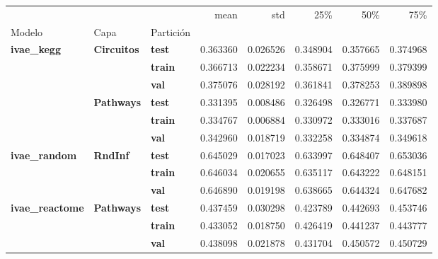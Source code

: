 \begin{tabular}{lllrrrrr}
\toprule
 &  &  & mean & std & 25\% & 50\% & 75\% \\
Modelo & Capa & Partición &  &  &  &  &  \\
\midrule
\multirow[t]{6}{*}{\textbf{ivae\_kegg}} & \multirow[t]{3}{*}{\textbf{Circuitos}} & \textbf{test} & 0.363360 & 0.026526 & 0.348904 & 0.357665 & 0.374968 \\
\textbf{} & \textbf{} & \textbf{train} & 0.366713 & 0.022234 & 0.358671 & 0.375999 & 0.379399 \\
\textbf{} & \textbf{} & \textbf{val} & 0.375076 & 0.028192 & 0.361841 & 0.378253 & 0.389898 \\
\cline{2-8}
\textbf{} & \multirow[t]{3}{*}{\textbf{Pathways}} & \textbf{test} & 0.331395 & 0.008486 & 0.326498 & 0.326771 & 0.333980 \\
\textbf{} & \textbf{} & \textbf{train} & 0.334767 & 0.006884 & 0.330972 & 0.333016 & 0.337687 \\
\textbf{} & \textbf{} & \textbf{val} & 0.342960 & 0.018719 & 0.332258 & 0.334874 & 0.349618 \\
\cline{1-8} \cline{2-8}
\multirow[t]{3}{*}{\textbf{ivae\_random}} & \multirow[t]{3}{*}{\textbf{RndInf}} & \textbf{test} & 0.645029 & 0.017023 & 0.633997 & 0.648407 & 0.653036 \\
\textbf{} & \textbf{} & \textbf{train} & 0.646034 & 0.020655 & 0.635117 & 0.643222 & 0.648151 \\
\textbf{} & \textbf{} & \textbf{val} & 0.646890 & 0.019198 & 0.638665 & 0.644324 & 0.647682 \\
\cline{1-8} \cline{2-8}
\multirow[t]{3}{*}{\textbf{ivae\_reactome}} & \multirow[t]{3}{*}{\textbf{Pathways}} & \textbf{test} & 0.437459 & 0.030298 & 0.423789 & 0.442693 & 0.453746 \\
\textbf{} & \textbf{} & \textbf{train} & 0.433052 & 0.018750 & 0.426419 & 0.441237 & 0.443777 \\
\textbf{} & \textbf{} & \textbf{val} & 0.438098 & 0.021878 & 0.431704 & 0.450572 & 0.450729 \\
\cline{1-8} \cline{2-8}
\bottomrule
\end{tabular}
